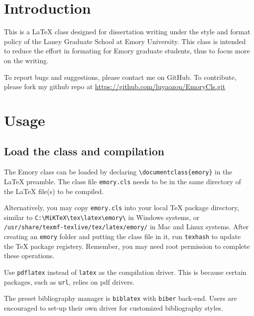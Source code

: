\documentclass[draft]{emory}
\begin{document}
\maketoc

\chapter{Introduction}

This is a \LaTeX{} class designed for dissertation writing under the style and
format policy of the Laney Graduate School at Emory University.\autocite{emory-style}
This class is
intended to reduce the effort in formating for Emory graduate students, thus 
to focus more on the writing. 

To report bugs and suggestions, please contact me on GitHub. To contribute, 
please fork my github repo at \url{https://github.com/luyaozou/EmoryCls.git}

\chapter{Usage}
\section{Load the class and compilation}
The Emory class can be loaded by declaring
\Verb|\documentclass{emory}| in the \LaTeX{} preamble. The class file
\Verb|emory.cls| needs to be in the same directory of the \LaTeX{} file(s) to be 
compiled. 

Alternatively, you may copy \Verb|emory.cls| into your local \TeX{} package 
directory, similar to \Verb|C:\MiKTeX\tex\latex\emory\| in Windows systems, or\\
\Verb|/usr/share/texmf-texlive/tex/latex/emory/| in Mac and Linux systems. After
creating an \Verb|emory| folder and putting the class file in it, run
\Verb|texhash| to update the \TeX{} package registery. Remember, you may need
root permission to complete these operations. 

Use \Verb|pdflatex| instead of \Verb|latex| as the compilation driver. This
is because certain packages, such as \Verb|url|, relies on pdf drivers.

The preset bibliography manager is \Verb|biblatex| with \Verb|biber| back-end. 
Users are encouraged to set-up their own \BibTeX{} driver for customized bibliography styles.
\end{document}
